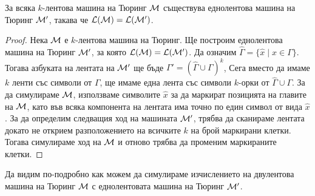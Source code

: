 \begin{prop}
  За всяка $k$-лентова машина на Тюринг $\mathcal{M}$ съществува еднолентова машина на Тюринг $\mathcal{M}'$,
  такава че $\mathcal{L}(\mathcal{M}) = \mathcal{L}(\mathcal{M}')$.
\end{prop}
\begin{proof}
  Нека $\mathcal{M}$ е $k$-лентова машина на Тюринг.
  Ще построим еднолентова машина на Тюринг $\mathcal{M}'$, за която $\mathcal{L}(\mathcal{M}) = \mathcal{L}(\mathcal{M}')$.
  Да означим $\hat\Gamma = \{\hat x \mid x \in \Gamma\}$.
  Тогава азбуката на лентата на $\mathcal{M}'$ ще бъде $\Gamma' = (\hat\Gamma \cup \Gamma)^{k}$,
  Сега вместо да имаме $k$ ленти със символи от $\Gamma$, ще имаме една лента със символи $k$-орки от $\hat\Gamma \cup \Gamma$.
  За да симулираме $\mathcal{M}$, използваме символите $\hat x$ за да маркират позицията на главите на $\mathcal{M}$,
  като във всяка компонента на лентата има точно по един символ от вида $\hat x$.
  За да определим следващия ход на машината $\mathcal{M}'$, трябва да сканираме лентата докато не 
  открием разположението на всичките $k$ на брой маркирани клетки. Тогава симулираме ход на $\mathcal{M}$
  и отново трябва да променим маркираните клетки.
\end{proof}

Да видим по-подробно как можем да симулираме изчислението на двулентова машина на Тюринг $\mathcal{M}$ с еднолентовата машина на Тюринг $\mathcal{M}'$.

